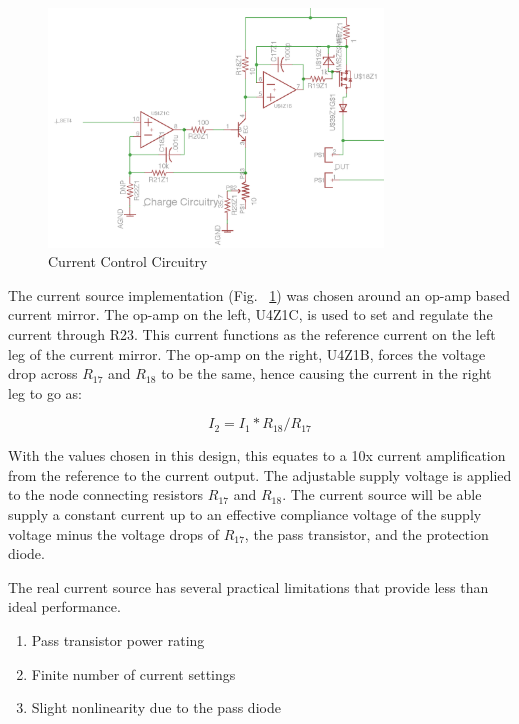 \documentclass[journal]{IEEEtran}
\begin{document}
    \begin{figure}[here]
    \centering
    \includegraphics[width=3.5in]{currentMirror}
    \caption{Current Control Circuitry}
    \label{fig:currentMirror}
    \end{figure}


    The current source implementation (Fig. ~\ref{fig:currentMirror}) was chosen around an op-amp based current mirror. The op-amp on the left, U4Z1C, is used to set and regulate the current through R23. This current functions as the reference current on the left leg of the current mirror. The op-amp on the right, U4Z1B, forces the voltage drop across $R_{17}$ and $R_{18}$ to be the same, hence causing the current in the right leg to go as:

    \begin{equation}
    I_2 = I_1*R_{18}/R_{17}
    \end{equation}

    With the values chosen in this design, this equates to a 10x current amplification from the reference to the current output. The adjustable supply voltage is applied to the node connecting resistors $R_{17}$ and $R_{18}$. The current source will be able supply a constant current up to an effective compliance voltage of the supply voltage minus the voltage drops of $R_{17}$, the pass transistor, and the protection diode.

    The real current source has several practical limitations that provide less than ideal performance. 

    \begin{enumerate}
    \item Pass transistor power rating
    \item Finite number of current settings
    \item Slight nonlinearity due to the pass diode
    \end{enumerate}
\end{document}

